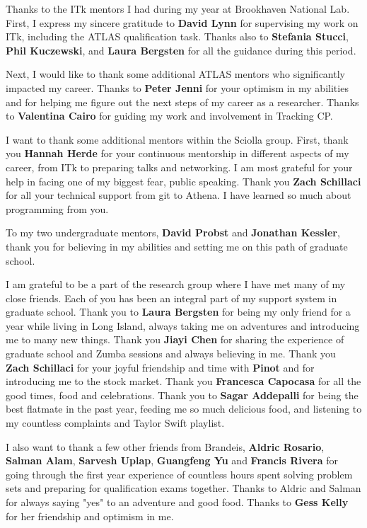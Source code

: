 \documentclass[red]{brandeis-dissertation}
\numberwithin{equation}{section}
\begin{document}
Thanks to the ITk mentors I had during my year at Brookhaven National Lab. First, I express my sincere gratitude to \textbf{David Lynn} for supervising my work on ITk, including the ATLAS qualification task. Thanks also to \textbf{Stefania Stucci}, \textbf{Phil Kuczewski}, and \textbf{Laura Bergsten} for all the guidance during this period. 

Next, I would like to thank some additional ATLAS mentors who significantly impacted my career. Thanks to \textbf{Peter Jenni} for your optimism in my abilities and for helping me figure out the next steps of my career as a researcher. Thanks to \textbf{Valentina Cairo} for guiding my work and involvement in Tracking CP. 

I want to thank some additional mentors within the Sciolla group. First, thank you \textbf{Hannah Herde} for your continuous mentorship in different aspects of my career, from ITk to preparing talks and networking. I am most grateful for your help in facing one of my biggest fear, public speaking. Thank you \textbf{Zach Schillaci} for all your technical support from git to Athena. I have learned so much about programming from you. 

To my two undergraduate mentors, \textbf{David Probst} and \textbf{Jonathan Kessler}, thank you for believing in my abilities and setting me on this path of graduate school. 

I am grateful to be a part of the research group where I have met many of my close friends. Each of you has been an integral part of my support system in graduate school. Thank you to \textbf{Laura Bergsten} for being my only friend for a year while living in Long Island, always taking me on adventures and introducing me to many new things. Thank you \textbf{Jiayi Chen} for sharing the experience of graduate school and Zumba sessions and always believing in me. Thank you \textbf{Zach Schillaci} for your joyful friendship and time with \textbf{Pinot} and for introducing me to the stock market. Thank you \textbf{Francesca Capocasa} for all the good times, food and celebrations. Thank you to \textbf{Sagar Addepalli} for being the best flatmate in the past year, feeding me so much delicious food, and listening to my countless complaints and Taylor Swift playlist. 

I also want to thank a few other friends from Brandeis, \textbf{Aldric Rosario}, \textbf{Salman Alam}, \textbf{Sarvesh Uplap}, \textbf{Guangfeng Yu} and \textbf{Francis Rivera} for going through the first year experience of countless hours spent solving problem sets and preparing for qualification exams together. Thanks to Aldric and Salman for always saying "yes" to an adventure and good food. Thanks to \textbf{Gess Kelly} for her friendship and optimism in me. 
\end{document}
